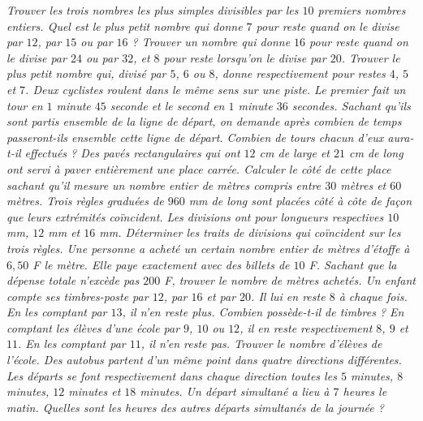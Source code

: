 \begin{itemize}
 \it Trouver les trois nombres les plus simples divisibles par les $10$ premiers nombres entiers. 
 \it Quel est le plus petit nombre qui donne $7$ pour reste quand on le divise par $12$, par $15$ ou par $16$ ? 
 \it Trouver un nombre qui donne $16$ pour reste quand on
 le divise par $24$ ou par $32$, et $8$ pour reste lorsqu'on le divise par $20$. 
 \it Trouver le plus petit nombre qui, divisé par $5$, $6$ ou $8$, donne respectivement pour restes $4$, $5$ et $7$. 
\it Deux cyclistes roulent dans le même sens sur une piste. Le premier fait un tour en $1$ minute $45$ seconde et le second en $1$ minute $36$ secondes. Sachant qu'ils sont partis ensemble de la ligne de départ, on demande après combien de temps passeront-ils ensemble cette ligne de départ. Combien de tours chacun d'eux aura-t-il effectués ? 
\it Des pavés rectangulaires qui ont $12$ cm de large et
$21$ cm de long ont servi à paver entièrement une place carrée. Calculer le côté de cette place sachant qu'il mesure un nombre entier de mètres compris entre $30$ mètres et $60$ mètres. 
\it Trois règles graduées de $960$ mm de long sont placées côté à côte de façon que leurs extrémités coïncident. Les divisions ont pour longueurs respectives $10$ mm, $12$ mm et $16$ mm. Déterminer les traits de divisions qui coïncident sur les trois règles. 
\it Une personne a acheté un certain nombre entier de mètres d'étoffe à $6,50$ F le mètre. Elle paye exactement avec des billets de $10$ F. Sachant que la dépense totale n'excède pas $200$ F, trouver le nombre de mètres achetés.
\it Un enfant compte ses timbres-poste par $12$, par $16$ et par $20$. Il lui en reste $8$ à chaque fois. En les comptant par $13$, il n'en reste plus. Combien possède-t-il de timbres ? 
\it En comptant les élèves d'une école par $9$, $10$ ou $12$, il en reste respectivement $8$, $9$ et $11$. En les comptant par $11$, il n'en reste pas. Trouver le nombre
d'élèves de l'école. 
\it Des autobus partent d'un même point dans quatre directions différentes. Les départs se font respectivement dans chaque direction toutes les $5$ minutes, $8$ minutes, $12$ minutes et $18$ minutes. Un départ simultané a lieu à $7$ heures le matin. Quelles sont les heures des autres départs simultanés de la journée ? 

 \end{itemize}